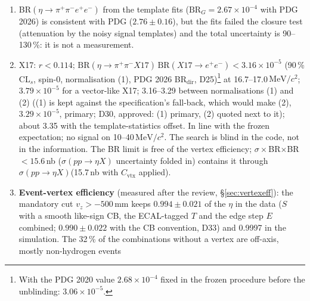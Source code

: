 \documentclass[11pt,a4paper]{article}
\newcommand{\ee}{\ensuremath{e^{+}e^{-}}\xspace}
\newcommand{\pipi}{\ensuremath{\pi^{+}\pi^{-}}\xspace}
\newcommand{\ppee}{\ensuremath{\pi^{+}\pi^{-}e^{+}e^{-}}\xspace}
\newcommand{\MeVcc}{\ensuremath{\mathrm{MeV}/c^{2}}\xspace}
\newcommand{\vz}{\ensuremath{v_z}\xspace}
\newcommand{\BRG}{\ensuremath{\mathrm{BR}_G}\xspace}
\newcommand{\sigeta}{\ensuremath{\sigma(pp\to\eta X)}\xspace}
\newcommand{\BRX}{\ensuremath{\mathrm{BR}(\eta\to\pipi X17)\,\mathrm{BR}(X17\to\ee)}\xspace}
\begin{document}
\begin{enumerate}
      removes them as designed ($N-\mathrm{CB}=16.8\pm13.9$ against the expected bump signal 16.9; artefact 2.6$\sigma$ away), it is not a
      charge flip ($<1.2$\,\%), and no number changes (D39, approved; verified). The low-mass tail of the
      SMASH peak term (the leptons' radiation in the material) reaches the edge: $f$ moves by $+6.8$\,\% (per slice $+7.3$\,\%) per unit of its
      size, which the data cannot fix ($t=0.3\pm1.0$); a term of $\pm3.4$ / $\pm3.6$\,\% is counted (D40, approved: total 11.6\,\% instead of
      11.1\,\%). Only the background-subtracted bump area (B4, the main bump estimator by fall-back) and the double ratio derived from it remain
      \textbf{not determined}: the background in the bump window must be extrapolated 40--120\,\MeVcc from above the peak, and a quadratic term
      or a different control region moves B4 by 40--150\,\%.
\item BR$(\eta\to\ppee)$ from the template fits ($\BRG=2.67\times10^{-4}$ with PDG 2026) is consistent with PDG ($2.76\pm0.16$), but the fits failed
      the closure test (attenuation by the noisy signal templates) and the total uncertainty is 90--130\,\%: it is not a measurement.
\item X17: $r<0.114$; $\BRX<3.16\times10^{-5}$ (90\,\% CL$_s$, spin-0, normalisation (1), PDG 2026 BR$_{\mathrm{dir}}$,
      D25)\footnote{With the PDG 2020 value $2.68\times10^{-4}$ fixed in the frozen procedure before the unblinding: $3.06\times10^{-5}$.} at
      16.7--17.0\,\MeVcc; $3.79\times10^{-5}$ for a vector-like X17; 3.16--3.29 between normalisations (1) and
      (2) ((1) is kept against the specification's fall-back, which would make (2), $3.29\times10^{-5}$, primary; D30, approved: (1) primary, (2) quoted next to it);
      about 3.35 with the template-statistics offset. In line
      with the frozen expectation; no signal on 10--40\,\MeVcc. The search is blind in the code, not in the information. The BR limit is free of
      the vertex efficiency; $\sigma\times$BR$\times$BR $<15.6$\,nb (\sigeta uncertainty folded in) contains it through \sigeta (15.7\,nb
      with $C_{\mathrm{vtx}}$ applied).
\item \textbf{Event-vertex efficiency} (measured after the review, \S\ref{sec:vertexeff}): the mandatory cut $\vz>-500$\,mm keeps
      $0.994\pm0.021$ of the $\eta$ in the data ($S$ with a smooth like-sign CB, the ECAL-tagged $T$ and the edge step $E$ combined; $0.990\pm0.022$
      with the CB convention, D33) and 0.9997 in the simulation. The 32\,\% of the combinations without a vertex are off-axis, mostly non-hydrogen events

\end{enumerate}
\end{document}
